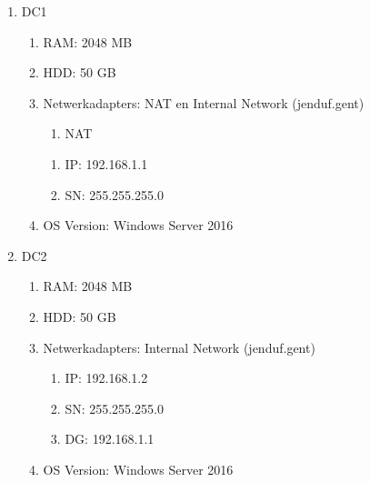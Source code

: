 \documentclass[a4paper]{article}
\begin{document}
\begin{enumerate}
\item DC1
    \begin{enumerate}
    \item RAM: 2048 MB
    \item HDD: 50 GB
    \item Netwerkadapters: NAT en Internal Network (jenduf.gent)
            \begin{enumerate}
            \item NAT
            \end{enumerate}
            \begin{enumerate}
            \item IP: 192.168.1.1
            \item SN: 255.255.255.0
            \end{enumerate}
    \item OS Version: Windows Server 2016 
    \end{enumerate}
    
\clearpage

\item DC2
    \begin{enumerate}
    \item RAM: 2048 MB
    \item HDD: 50 GB
    \item Netwerkadapters: Internal Network (jenduf.gent)
            \begin{enumerate}
            \item IP: 192.168.1.2
            \item SN: 255.255.255.0
            \item DG: 192.168.1.1
            \end{enumerate}
    \item OS Version: Windows Server 2016 
    \end{enumerate}
    

\end{enumerate}
\end{document}
